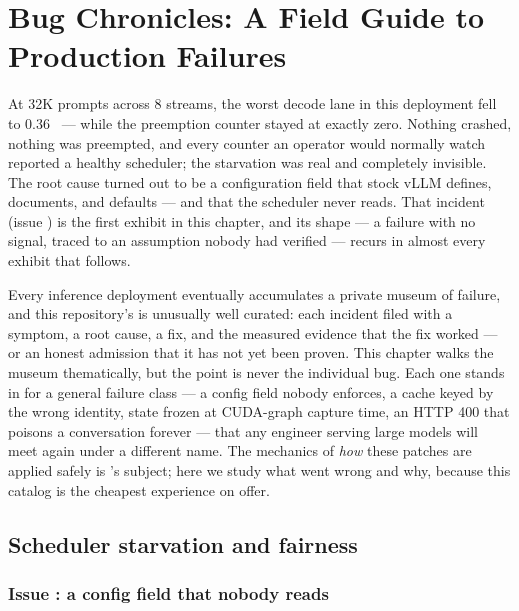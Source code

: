 
\chapter{Bug Chronicles: A Field Guide to Production Failures}
\label{ch:bugs}

At 32K prompts across 8 streams, the worst decode lane in this deployment
fell to 0.36~\tokspersec{} --- while the preemption counter stayed at exactly
zero. Nothing crashed, nothing was preempted, and every counter an operator
would normally watch reported a healthy scheduler; the starvation was real
and completely invisible. The root cause turned out to be a configuration
field that stock vLLM defines, documents, and defaults --- and that the
scheduler never reads. That incident (issue ) is the first
exhibit in this chapter, and its shape --- a failure with no signal, traced
to an assumption nobody had verified --- recurs in almost every exhibit that
follows.

Every inference deployment eventually accumulates a private museum of
failure, and this repository's is unusually well curated: each incident filed
with a symptom, a root cause, a fix, and the measured evidence that the fix
worked --- or an honest admission that it has not yet been proven. This
chapter walks the museum thematically, but the point is never the individual
bug. Each one stands in for a general failure class --- a config field nobody
enforces, a cache keyed by the wrong identity, state frozen at CUDA-graph
capture time, an HTTP 400 that poisons a conversation forever --- that any
engineer serving large models will meet again under a different name. The
mechanics of \emph{how} these patches are applied safely is
's subject; here we study what went wrong and why, because
this catalog is the cheapest experience on offer.

\section{Scheduler starvation and fairness}
\label{sec:bugs-scheduler}

\subsection{Issue : a config field that nobody reads}

